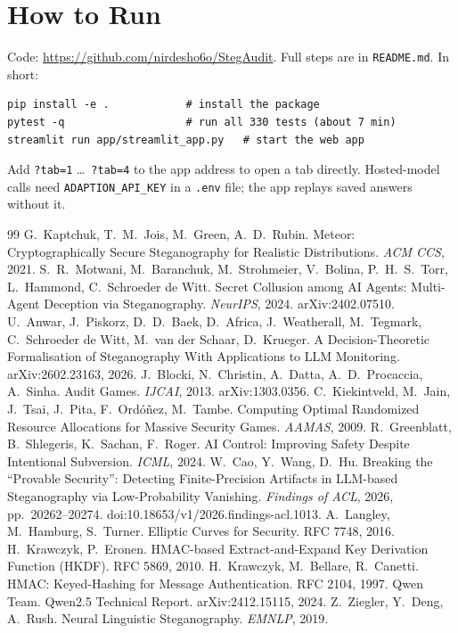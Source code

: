 \documentclass[11pt,a4paper]{article}
\newcommand{\repourl}{https://github.com/nirdesho6o/StegAudit}
\newcommand{\repolink}{\expandafter\url\expandafter{\repourl}}
\begin{document}
\section{How to Run}
Code: \repolink. Full steps are in \texttt{README.md}. In short:
\begin{verbatim}
pip install -e .            # install the package
pytest -q                   # run all 330 tests (about 7 min)
streamlit run app/streamlit_app.py   # start the web app
\end{verbatim}
Add \texttt{?tab=1} \ldots\ \texttt{?tab=4} to the app address to open a tab directly.
Hosted-model calls need \texttt{ADAPTION\_API\_KEY} in a \texttt{.env} file; the app replays saved answers without it.

\begin{thebibliography}{99}
 G.~Kaptchuk, T.~M.~Jois, M.~Green, A.~D.~Rubin. Meteor: Cryptographically Secure Steganography for Realistic Distributions. \emph{ACM CCS}, 2021.
 S.~R.~Motwani, M.~Baranchuk, M.~Strohmeier, V.~Bolina, P.~H.~S.~Torr, L.~Hammond, C.~Schroeder de Witt. Secret Collusion among AI Agents: Multi-Agent Deception via Steganography. \emph{NeurIPS}, 2024. arXiv:2402.07510.
 U.~Anwar, J.~Piskorz, D.~D.~Baek, D.~Africa, J.~Weatherall, M.~Tegmark, C.~Schroeder de Witt, M.~van der Schaar, D.~Krueger. A Decision-Theoretic Formalisation of Steganography With Applications to LLM Monitoring. arXiv:2602.23163, 2026.
 J.~Blocki, N.~Christin, A.~Datta, A.~D.~Procaccia, A.~Sinha. Audit Games. \emph{IJCAI}, 2013. arXiv:1303.0356.
 C.~Kiekintveld, M.~Jain, J.~Tsai, J.~Pita, F.~Ord\'o\~nez, M.~Tambe. Computing Optimal Randomized Resource Allocations for Massive Security Games. \emph{AAMAS}, 2009.
 R.~Greenblatt, B.~Shlegeris, K.~Sachan, F.~Roger. AI Control: Improving Safety Despite Intentional Subversion. \emph{ICML}, 2024.
 W.~Cao, Y.~Wang, D.~Hu. Breaking the ``Provable Security'': Detecting Finite-Precision Artifacts in LLM-based Steganography via Low-Probability Vanishing. \emph{Findings of ACL}, 2026, pp.~20262--20274. doi:10.18653/v1/2026.findings-acl.1013.
 A.~Langley, M.~Hamburg, S.~Turner. Elliptic Curves for Security. RFC 7748, 2016.
 H.~Krawczyk, P.~Eronen. HMAC-based Extract-and-Expand Key Derivation Function (HKDF). RFC 5869, 2010.
 H.~Krawczyk, M.~Bellare, R.~Canetti. HMAC: Keyed-Hashing for Message Authentication. RFC 2104, 1997.
 Qwen Team. Qwen2.5 Technical Report. arXiv:2412.15115, 2024.
 Z.~Ziegler, Y.~Deng, A.~Rush. Neural Linguistic Steganography. \emph{EMNLP}, 2019.
\end{thebibliography}
\end{document}
